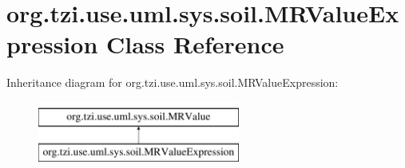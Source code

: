\hypertarget{classorg_1_1tzi_1_1use_1_1uml_1_1sys_1_1soil_1_1_m_r_value_expression}{\section{org.\-tzi.\-use.\-uml.\-sys.\-soil.\-M\-R\-Value\-Expression Class Reference}
\label{classorg_1_1tzi_1_1use_1_1uml_1_1sys_1_1soil_1_1_m_r_value_expression}
}
Inheritance diagram for org.\-tzi.\-use.\-uml.\-sys.\-soil.\-M\-R\-Value\-Expression\-:\begin{figure}[H]
\begin{center}
\leavevmode
\includegraphics[height=2.000000cm]{classorg_1_1tzi_1_1use_1_1uml_1_1sys_1_1soil_1_1_m_r_value_expression}
\end{center}
\end{figure}

